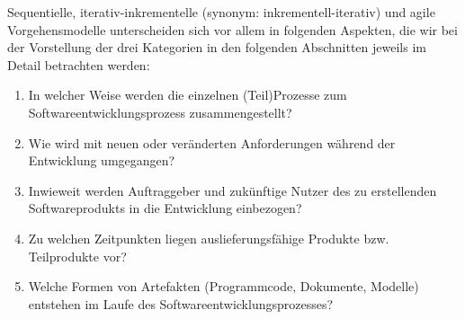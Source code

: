 Sequentielle, iterativ-inkrementelle (synonym: inkrementell-iterativ) und agile Vorgehensmodelle unterscheiden sich vor allem in folgenden Aspekten, die wir bei der Vorstellung der drei Kategorien in den folgenden Abschnitten jeweils im Detail betrachten werden:

\begin{enumerate}
	\item In welcher Weise werden die einzelnen (Teil)Prozesse zum Softwareentwicklungsprozess zusammengestellt?
	\item Wie wird mit neuen oder veränderten Anforderungen während der Entwicklung umgegangen?
	\item Inwieweit werden Auftraggeber und zukünftige Nutzer des zu erstellenden Softwareprodukts in die Entwicklung einbezogen?
	\item Zu welchen Zeitpunkten liegen auslieferungsfähige Produkte bzw. Teilprodukte vor?
	\item Welche Formen von Artefakten (\zb Programmcode, Dokumente, Modelle) entstehen im Laufe des Softwareentwicklungsprozesses?
\end{enumerate}
